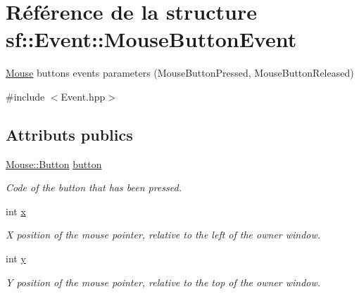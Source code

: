 \hypertarget{structsf_1_1Event_1_1MouseButtonEvent}{}\section{Référence de la structure sf\+:\+:Event\+:\+:Mouse\+Button\+Event}
\label{structsf_1_1Event_1_1MouseButtonEvent}


\hyperlink{classsf_1_1Mouse}{Mouse} buttons events parameters (Mouse\+Button\+Pressed, Mouse\+Button\+Released)  




{\ttfamily \#include $<$Event.\+hpp$>$}

\subsection*{Attributs publics}
\begin{DoxyCompactItemize}
\item 
\mbox{\label{structsf_1_1Event_1_1MouseButtonEvent_a5f53725aa7b647705486eeb95f723024}} 
\hyperlink{classsf_1_1Mouse_a4fb128be433f9aafe66bc0c605daaa90}{Mouse\+::\+Button} \hyperlink{structsf_1_1Event_1_1MouseButtonEvent_a5f53725aa7b647705486eeb95f723024}{button}
\begin{DoxyCompactList}\small\item\em Code of the button that has been pressed. \end{DoxyCompactList}\item 
\mbox{\label{structsf_1_1Event_1_1MouseButtonEvent_a49b937b311729174950787781aafcdc7}} 
int \hyperlink{structsf_1_1Event_1_1MouseButtonEvent_a49b937b311729174950787781aafcdc7}{x}
\begin{DoxyCompactList}\small\item\em X position of the mouse pointer, relative to the left of the owner window. \end{DoxyCompactList}\item 
\mbox{\label{structsf_1_1Event_1_1MouseButtonEvent_aae4735071868d4411d1782bf67619d64}} 
int \hyperlink{structsf_1_1Event_1_1MouseButtonEvent_aae4735071868d4411d1782bf67619d64}{y}
\begin{DoxyCompactList}\small\item\em Y position of the mouse pointer, relative to the top of the owner window. \end{DoxyCompactList}\end{DoxyCompactItemize}


